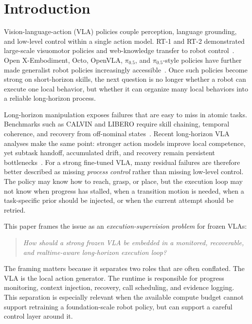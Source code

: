 \documentclass[runningheads]{waica}
\newcommand{\pizero}{$\pi_{0.5}$}
\begin{document}
\begin{abstract}
\end{abstract}

\section{Introduction}
\label{sec:intro}

Vision-language-action (VLA) policies couple perception, language grounding, and low-level control within a single action model.
RT-1 and RT-2 demonstrated large-scale visuomotor policies and web-knowledge transfer to robot control~\cite{brohan2022rt1,brohan2023rt2}.
Open X-Embodiment, Octo, OpenVLA, \pizero{}, and \pizero{}-style policies have further made generalist robot policies increasingly accessible~\cite{oneill2023openx,octo2024octo,kim2024openvla,black2024pi0,physicalintelligence2025pi05}.
Once such policies become strong on short-horizon skills, the next question is no longer whether a robot can execute one local behavior, but whether it can organize many local behaviors into a reliable long-horizon process.

Long-horizon manipulation exposes failures that are easy to miss in atomic tasks.
Benchmarks such as CALVIN and LIBERO require skill chaining, temporal coherence, and recovery from off-nominal states~\cite{mees2021calvin,liu2023libero}.
Recent long-horizon VLA analyses make the same point: stronger action models improve local competence, yet subtask handoff, accumulated drift, and recovery remain persistent bottlenecks~\cite{fan2025longvla,han2025robocerebra}.
For a strong fine-tuned VLA, many residual failures are therefore better described as missing \emph{process control} rather than missing low-level control.
The policy may know how to reach, grasp, or place, but the execution loop may not know when progress has stalled, when a transition motion is needed, when a task-specific prior should be injected, or when the current attempt should be retried.

This paper frames the issue as an \emph{execution-supervision problem} for frozen VLAs:
\begin{quote}
\emph{How should a strong frozen VLA be embedded in a monitored, recoverable, and realtime-aware long-horizon execution loop?}
\end{quote}
The framing matters because it separates two roles that are often conflated.
The VLA is the local action generator.
The runtime is responsible for progress monitoring, context injection, recovery, call scheduling, and evidence logging.
This separation is especially relevant when the available compute budget cannot support retraining a foundation-scale robot policy, but can support a careful control layer around it.
\end{document}
